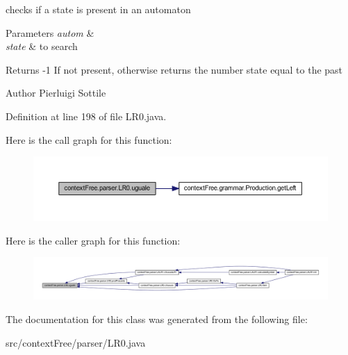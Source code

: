 checks if a state is present in an automaton 


\begin{DoxyParams}{Parameters}
{\em autom} & \\
\hline
{\em state} & to search \\
\hline
\end{DoxyParams}
\begin{DoxyReturn}{Returns}
-\/1 If not present, otherwise returns the number state equal to the past 
\end{DoxyReturn}
\begin{DoxyAuthor}{Author}
Pierluigi Sottile 
\end{DoxyAuthor}


Definition at line 198 of file L\-R0.\-java.



Here is the call graph for this function\-:
\nopagebreak
\begin{figure}[H]
\begin{center}
\leavevmode
\includegraphics[width=350pt]{classcontext_free_1_1parser_1_1_l_r0_a8de929e041a5a1a273e6ddd05dc7e0ca_cgraph}
\end{center}
\end{figure}




Here is the caller graph for this function\-:
\nopagebreak
\begin{figure}[H]
\begin{center}
\leavevmode
\includegraphics[width=350pt]{classcontext_free_1_1parser_1_1_l_r0_a8de929e041a5a1a273e6ddd05dc7e0ca_icgraph}
\end{center}
\end{figure}




The documentation for this class was generated from the following file\-:\begin{DoxyCompactItemize}
\item 
src/context\-Free/parser/L\-R0.\-java\end{DoxyCompactItemize}
